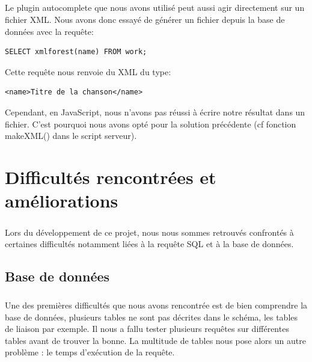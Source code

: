 \documentclass{report}
\begin{document}
	\paragraph{}{
		Le plugin autocomplete que nous avons utilisé peut aussi agir directement sur un fichier XML. Nous avons donc essayé de générer un fichier depuis la base de données avec la requête:

\begin{lstlisting}
SELECT xmlforest(name) FROM work;
\end{lstlisting}

	Cette requête nous renvoie du XML du type:

\begin{lstlisting}
<name>Titre de la chanson</name>
\end{lstlisting}	
	
		Cependant, en JavaScript, nous n'avons pas réussi à écrire notre résultat dans un fichier. C'est pourquoi nous avons opté pour la solution précédente (cf fonction makeXML() dans le script serveur).		
		
	}



%
\chapter*{Difficultés rencontrées et améliorations}
\thispagestyle{fancy}
	\paragraph{}{
		Lors du développement de ce projet, nous nous sommes retrouvés confrontés à certaines difficultés notamment liées à la requête SQL et à la base de données.

	}
	\section*{Base de données}

	\paragraph{}{
		Une des premières difficultés que nous avons rencontrée est de bien comprendre la base de données, plusieurs tables ne sont pas décrites dans le schéma, les tables de liaison par exemple. Il nous a fallu tester plusieurs requêtes sur différentes tables avant de trouver la bonne. La multitude de tables nous pose alors un autre problème : le temps d'exécution de la requête.
	}
\end{document}
